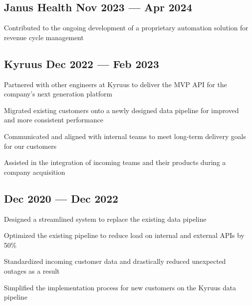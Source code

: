 
\subsection{{Janus Health \hfill Nov 2023 --- Apr 2024}}
\begin{zitemize}
\item Contributed to the ongoing development of a proprietary automation solution for revenue cycle management
\end{zitemize}

\subsection{{Kyruus \hfill Dec 2022 --- Feb 2023}}
\begin{zitemize}
\item Partnered with other engineers at Kyruus to deliver the MVP API for the company's next generation platform
\item Migrated existing customers onto a newly designed data pipeline for improved and more consistent performance
\item Communicated and aligned with internal teams to meet long-term delivery goals for our customers
\item Assisted in the integration of incoming teams and their products during a company acquisition
\end{zitemize}

\subsection{{\hfill Dec 2020 --- Dec 2022}}
\begin{zitemize}
\item Designed a streamlined system to replace the existing data pipeline
\item Optimized the existing pipeline to reduce load on internal and external APIs by 50\%
\item Standardized incoming customer data and drastically reduced unexpected outages as a result
\item Simplified the implementation process for new customers on the Kyruus data pipeline
\end{zitemize}

